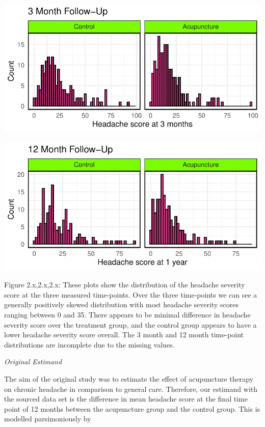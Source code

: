 \documentclass{article}
\newcommand{\pandocbounded}[1]{#1}
\begin{document}
\pandocbounded{\includegraphics[keepaspectratio]{Final_Report_files/figure-latex/unnamed-chunk-10-1.pdf}}

\pandocbounded{\includegraphics[keepaspectratio]{Final_Report_files/figure-latex/unnamed-chunk-11-1.pdf}}

Figure 2.x,2.x,2.x: These plots show the distribution of the headache
severity score at the three measured time-points. Over the three
time-points we can see a generally positively skewed distribution with
most headache severity scores ranging between 0 and 35. There appears to
be minimal difference in headache severity score over the treatment
group, and the control group appears to have a lower headache severity
score overall. The 3 month and 12 month time-point distributions are
incomplete due to the missing values.

\emph{Original Estimand}

The aim of the original study was to estimate the effect of acupuncture
therapy on chronic headache in comparison to general care. Therefore,
our estimand with the sourced data set is the difference in mean
headache score at the final time point of 12 months between the
acupuncture group and the control group. This is modelled parsimoniously
by
\end{document}
